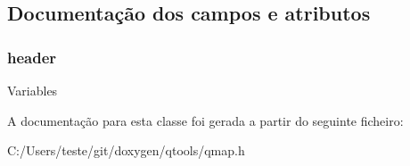 \subsection{Documentação dos campos e atributos}
\hypertarget{class_q_map_private_ab205bb945635f9ba0473b5fafbea11ed}{
\subsubsection[{header}]{ header\hspace{0.3cm}{\ttfamily [protected]}}}\label{class_q_map_private_ab205bb945635f9ba0473b5fafbea11ed}
Variables 

A documentação para esta classe foi gerada a partir do seguinte ficheiro\-:\begin{DoxyCompactItemize}
\item 
C\-:/\-Users/teste/git/doxygen/qtools/qmap.\-h\end{DoxyCompactItemize}
